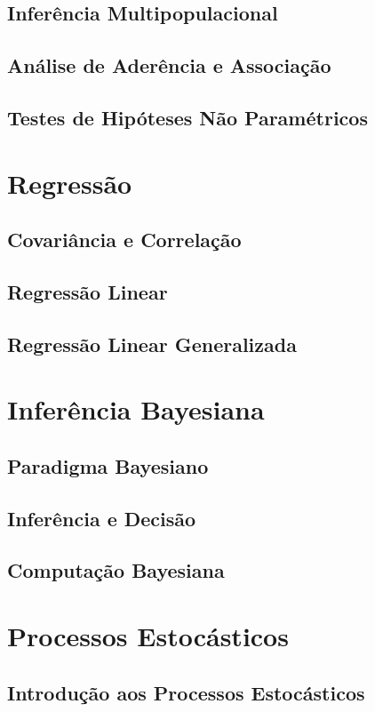 \documentclass[11pt, openany]{book}
\begin{document}
\chapter{Inferência Multipopulacional}
\chapter{Análise de Aderência e Associação}
\chapter{Testes de Hipóteses Não Paramétricos}

\part{Regressão}

\chapter{Covariância e Correlação}
\chapter{Regressão Linear}
\chapter{Regressão Linear Generalizada}

\part{Inferência Bayesiana}

\chapter{Paradigma Bayesiano}
\chapter{Inferência e Decisão}
\chapter{Computação Bayesiana}

\part{Processos Estocásticos}
\chapter{Introdução aos Processos Estocásticos}
\end{document}

